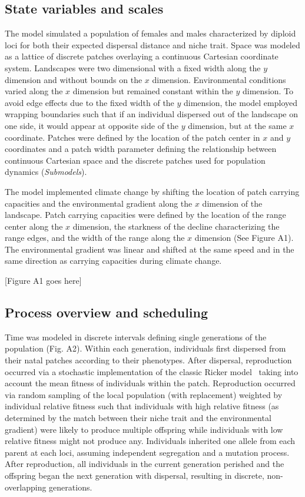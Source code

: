 \documentclass[11pt]{article}
\begin{document}
\subsection*{State variables and scales} 
The model simulated a population of females and males characterized by diploid loci for both their expected dispersal distance and niche trait. Space was modeled as a lattice of discrete patches overlaying a continuous Cartesian coordinate system. Landscapes were two dimensional with a fixed width along the $y$ dimension and without bounds on the $x$ dimension. Environmental conditions varied along the $x$ dimension but remained constant within the $y$ dimension. To avoid edge effects due to the fixed width of the $y$ dimension, the model employed wrapping boundaries such that if an individual dispersed out of the landscape on one side, it would appear at opposite side of the $y$ dimension, but at the same $x$ coordinate. Patches were defined by the location of the patch center in $x$ and $y$ coordinates and a patch width parameter defining the relationship between continuous Cartesian space and the discrete patches used for population dynamics (\textit{Submodels}). 

The model implemented climate change by shifting the location of patch carrying capacities and the environmental gradient along the $x$ dimension of the landscape. Patch carrying capacities were defined by the location of the range center along the $x$ dimension, the starkness of the decline characterizing the range edges, and the width of the range along the $x$ dimension (See Figure A1). The environmental gradient was linear and shifted at the same speed and in the same direction as carrying capacities during climate change.

[Figure A1 goes here]

\subsection*{Process overview and scheduling} 
Time was modeled in discrete intervals defining single generations of the population (Fig. A2). Within each generation, individuals first dispersed from their natal patches according to their phenotypes. After dispersal, reproduction occurred via a stochastic implementation of the classic Ricker model~\citep{ricker1954stock} taking into account the mean fitness of individuals within the patch. Reproduction occurred via random sampling of the local population (with replacement) weighted by individual relative fitness such that individuals with high relative fitness (as determined by the match between their niche trait and the environmental gradient) were likely to produce multiple offspring while individuals with low relative fitness might not produce any. Individuals inherited one allele from each parent at each loci, assuming independent segregation and a mutation process. After reproduction, all individuals in the current generation perished and the offspring began the next generation with dispersal, resulting in discrete, non-overlapping generations. 
\end{document}
